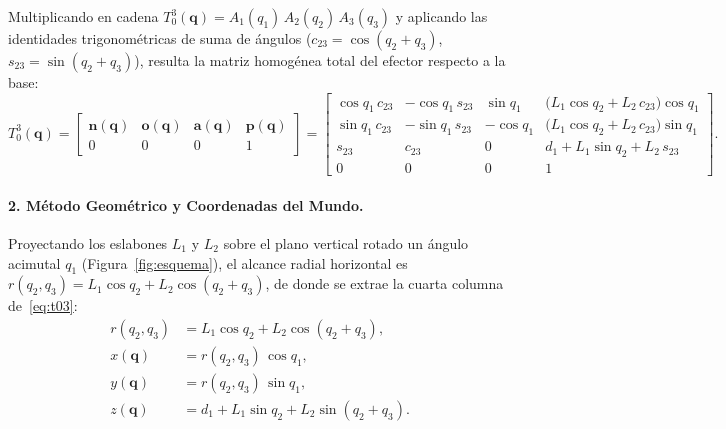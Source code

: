\documentclass[11pt,a4paper]{article}
\begin{document}
Multiplicando en cadena $T_{0}^{3}(\bm{q})=A_{1}(q_{1})\,A_{2}(q_{2})\,A_{3}(q_{3})$ y aplicando las identidades trigonométricas de suma de ángulos ($c_{23}=\cos(q_{2}+q_{3})$, $s_{23}=\sin(q_{2}+q_{3})$), resulta la matriz homogénea total del efector respecto a la base:
\begin{equation}\label{eq:t03}
T_{0}^{3}(\bm{q})=
\begin{bmatrix}
\bm{n}(\bm{q}) & \bm{o}(\bm{q}) & \bm{a}(\bm{q}) & \bm{p}(\bm{q})\\
0 & 0 & 0 & 1
\end{bmatrix}=
\begin{bmatrix}
\cos q_{1}\,c_{23} & -\cos q_{1}\,s_{23} &  \sin q_{1} & \bigl(L_{1}\cos q_{2}+L_{2}\,c_{23}\bigr)\cos q_{1}\\[3pt]
\sin q_{1}\,c_{23} & -\sin q_{1}\,s_{23} & -\cos q_{1} & \bigl(L_{1}\cos q_{2}+L_{2}\,c_{23}\bigr)\sin q_{1}\\[3pt]
s_{23}             &  c_{23}             &  0          & d_{1}+L_{1}\sin q_{2}+L_{2}\,s_{23}\\[3pt]
0                  &  0                  &  0          & 1
\end{bmatrix}.
\end{equation}

\paragraph{2. Método Geométrico y Coordenadas del Mundo.}
Proyectando los eslabones $L_{1}$ y $L_{2}$ sobre el plano vertical rotado un ángulo acimutal $q_{1}$ (Figura~\ref{fig:esquema}), el alcance radial horizontal es $r(q_{2},q_{3})=L_{1}\cos q_{2}+L_{2}\cos(q_{2}+q_{3})$, de donde se extrae la cuarta columna de~\eqref{eq:t03}:
\begin{equation}\label{eq:fk}
\boxed{
\begin{aligned}
r(q_{2},q_{3}) &= L_{1}\cos q_{2}+L_{2}\cos(q_{2}+q_{3}),\\
x(\bm{q}) &= r(q_{2},q_{3})\,\cos q_{1},\\
y(\bm{q}) &= r(q_{2},q_{3})\,\sin q_{1},\\
z(\bm{q}) &= d_{1}+L_{1}\sin q_{2}+L_{2}\sin(q_{2}+q_{3}).
\end{aligned}}
\end{equation}
\end{document}
